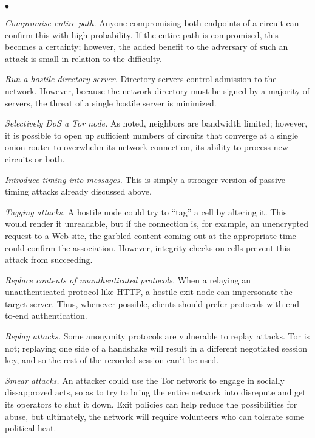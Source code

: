 \documentclass[times,10pt,twocolumn]{article}
\newenvironment{tightlist}{\begin{list}{$\bullet$}{
  \setlength{\itemsep}{0mm}
    \setlength{\parsep}{0mm}
    }}{\end{list}}
\begin{document}
\begin{tightlist}
\item \emph{Compromise entire path.} Anyone compromising both
  endpoints of a circuit can confirm this with high probability. If
  the entire path is compromised, this becomes a certainty; however,
  the added benefit to the adversary of such an attack is small in
  relation to the difficulty.
  
\item \emph{Run a hostile directory server.} Directory servers control
  admission to the network. However, because the network directory
  must be signed by a majority of servers, the threat of a single
  hostile server is minimized.
  
\item \emph{Selectively DoS a Tor node.} As noted, neighbors are
  bandwidth limited; however, it is possible to open up sufficient
  numbers of circuits that converge at a single onion router to
  overwhelm its network connection, its ability to process new
  circuits or both.

  
\item \emph{Introduce timing into messages.} This is simply a stronger
  version of passive timing attacks already discussed above.
  
\item \emph{Tagging attacks.} A hostile node could try to ``tag'' a
  cell by altering it. This would render it unreadable, but if the
  connection is, for example, an unencrypted request to a Web site,
  the garbled content coming out at the appropriate time could confirm
  the association. However, integrity checks on cells prevent
  this attack from succeeding.

\item \emph{Replace contents of unauthenticated protocols.}  When a
  relaying an unauthenticated protocol like HTTP, a hostile exit node 
  can impersonate the target server.  Thus, whenever possible, clients
  should prefer protocols with end-to-end authentication.

\item \emph{Replay attacks.} Some anonymity protocols are vulnerable
  to replay attacks.  Tor is not; replaying one side of a handshake
  will result in a different negotiated session key, and so the rest
  of the recorded session can't be used.  

\item \emph{Smear attacks.} An attacker could use the Tor network to
  engage in socially dissapproved acts, so as to try to bring the
  entire network into disrepute and get its operators to shut it down.
  Exit policies can help reduce the possibilities for abuse, but
  ultimately, the network will require volunteers who can tolerate
  some political heat.
\end{tightlist}
\end{document}
